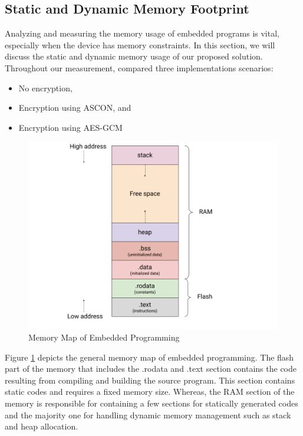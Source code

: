 \subsection{Static and Dynamic Memory Footprint }
Analyzing and measuring the memory usage of embedded programs is vital, especially when the device has memory constraints. In this section, we will discuss the static and dynamic memory usage of our proposed solution. Throughout our measurement,  compared three implementations scenarios:
\begin{itemize}
    \item No encryption,
    \item Encryption using ASCON, and
    \item Encryption using AES-GCM
\end{itemize}



\begin{figure}[H]
    \centering
    \includegraphics[width=\linewidth]{images/fp/memory-analysis.png}
    \caption{Memory Map of Embedded Programming \cite{alcarazDigitalTwinComprehensive2022}}
    \label{fig:memory-map}
\end{figure}

Figure \ref{fig:memory-map} depicts the general memory map of embedded programming. The flash part of the memory that includes the .rodata and .text section contains the code resulting from compiling and building the source program. This section contains static codes and requires a fixed memory size. Whereas, the RAM section of the memory is responsible for containing a few sections for statically generated codes and the majority one for handling dynamic memory management such as stack and heap allocation.


